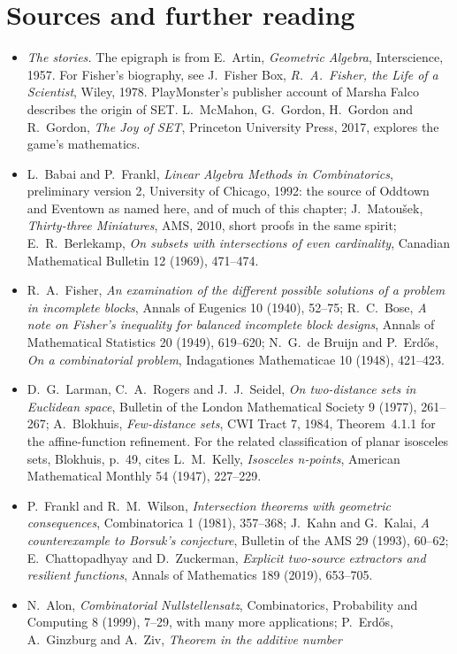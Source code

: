 \section*{Sources and further reading}

\begin{itemize}
\item \emph{The stories.} The epigraph is from E.~Artin, \emph{Geometric Algebra}, Interscience, 1957. For Fisher's biography, see J.~Fisher Box, \emph{R.~A.~Fisher, the Life of a
Scientist}, Wiley, 1978. PlayMonster's publisher account of Marsha Falco describes
the origin of SET. L.~McMahon, G.~Gordon, H.~Gordon and R.~Gordon,
\emph{The Joy of SET}, Princeton University Press, 2017, explores the game's mathematics.
\item L.~Babai and P.~Frankl, \emph{Linear Algebra Methods in Combinatorics}, preliminary version 2, University of Chicago, 1992: the source of Oddtown and Eventown as named here, and of much of this
chapter; J.~Matou\v{s}ek, \emph{Thirty-three Miniatures}, AMS, 2010, short proofs in the same spirit; E.~R.~Berlekamp, \emph{On subsets with intersections of even cardinality}, Canadian Mathematical Bulletin 12
(1969), 471--474.
\item R.~A.~Fisher, \emph{An examination of the different possible solutions of a problem in incomplete blocks}, Annals of Eugenics 10 (1940), 52--75; R.~C.~Bose, \emph{A note on Fisher's inequality for balanced
incomplete block designs}, Annals of Mathematical Statistics 20 (1949), 619--620; N.~G.~de Bruijn and P.~Erd\H os, \emph{On a combinatorial problem}, Indagationes Mathematicae 10 (1948), 421--423.
\item D.~G.~Larman, C.~A.~Rogers and J.~J.~Seidel, \emph{On two-distance sets in Euclidean space}, Bulletin of the London Mathematical Society 9 (1977), 261--267; A.~Blokhuis, \emph{Few-distance sets}, CWI Tract
7, 1984, Theorem~4.1.1 for the affine-function refinement. For the related
classification of planar isosceles sets, Blokhuis, p.~49, cites L.~M.~Kelly,
\emph{Isosceles n-points}, American Mathematical Monthly 54 (1947), 227--229.
\item P.~Frankl and R.~M.~Wilson, \emph{Intersection theorems with geometric consequences}, Combinatorica 1 (1981), 357--368; J.~Kahn and G.~Kalai, \emph{A counterexample to Borsuk's conjecture}, Bulletin of the AMS 29
(1993), 60--62; E.~Chattopadhyay and D.~Zuckerman, \emph{Explicit two-source extractors and resilient functions}, Annals of Mathematics 189 (2019), 653--705.
\item N.~Alon, \emph{Combinatorial Nullstellensatz}, Combinatorics, Probability and Computing 8 (1999), 7--29, with many more applications; P.~Erd\H os, A.~Ginzburg and A.~Ziv, \emph{Theorem in the additive number
}
\end{itemize}
